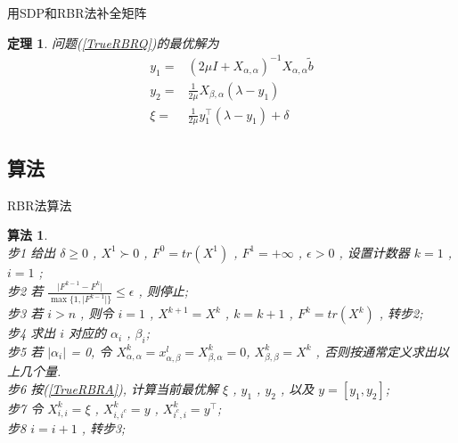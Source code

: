 \documentclass[slidestop,compress,mathserif,UTF8]{beamer}
\newtheorem{theo}{\bf \textcolor[rgb]{0.8,0,0}{定理}}[section]  %
\newtheorem{algo}{\bf \textcolor[rgb]{0.8,0,0}{算法}}
\numberwithin{equation}{section}
\begin{document}
            \begin{frame}[t]{用SDP和RBR法补全矩阵}
                \begin{theo}
                    问题(\ref{TrueRBRQ})的最优解为
                    \begin{equation}
                        \begin{split}\label{TrueRBRA}
                            y_1 = & (2 \mu I + X_{\alpha, \alpha})^{-1} X_{\alpha, \alpha}\tilde{b}\\
                            y_2 = & \frac{1}{2 \mu} X_{\beta, \alpha} (\lambda - y_1)\\
                            \xi = & \frac{1}{2 \mu} y_1^\top (\lambda - y_1) + \delta
                        \end{split}
                    \end{equation}
                \end{theo}
            \end{frame}
        \subsection{算法}
            \begin{frame}[t]{RBR法算法}
                \begin{algo}
                    \small\quad\\
                    步1 \quad 给出 $\delta \ge 0$ , $X^1 \succ 0$ , $F^0 = tr(X^1)$ , $F^1 = + \infty$ , $\epsilon > 0$ , 设置计数器 $k = 1$ , $i = 1$ ;\\
                    步2 \quad 若 $\frac{\lvert{F^{k - 1}-F^k}\rvert}{\max\{1,\lvert{F^{k - 1}}\rvert\}}\leq\epsilon$ , 则停止;\\
                    步3 \quad 若 $i>n$ , 则令 $i=1$ , $X^{k + 1}=X^k$ , $k=k + 1$ , $F^k = tr(X^k)$ , 转步2;\\
                    步4 \quad 求出 $i$ 对应的 $\alpha_i$ , $\beta_i$;\\
                    步5 \quad 若 $\vert{\alpha_i}\vert$ = 0, 令 $X^k_{\alpha, \alpha} = x^l_{\alpha, \beta} = X^k_{\beta, \alpha} = 0$, $X^k_{\beta, \beta} = X^k$ , 否则按通常定义求出以上几个量.\\
                    步6 \quad 按(\ref{TrueRBRA}), 计算当前最优解 $\xi$ , $y_1$ , $y_2$ , 以及 $y = [y_1, y_2]$;\\
                    步7 \quad 令 $X^{k}_{i, i} = \xi$ , $X^{k}_{i, i^c} = y$ , $X^{k}_{i^c, i} = y^\top$;\\
                    步8 \quad $i = i + 1$ , 转步3;\normalsize
                \end{algo}
            \end{frame}
\end{document}
